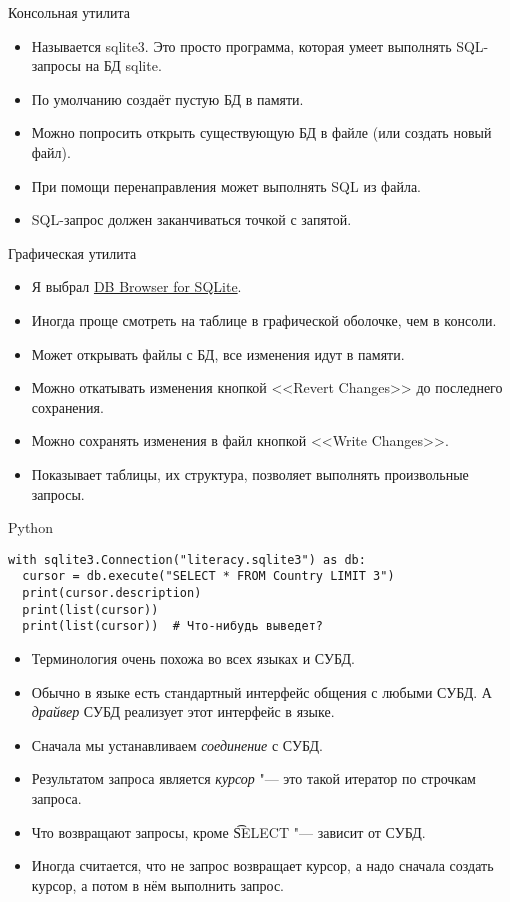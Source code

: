 \begin{frame}{Консольная утилита}
	\begin{itemize}
		\item Называется sqlite3. Это просто программа, которая умеет выполнять SQL-запросы на БД sqlite.
		\item По умолчанию создаёт пустую БД в памяти.
		\item Можно попросить открыть существующую БД в файле (или создать новый файл).
		\item При помощи перенаправления может выполнять SQL из файла.
		\item SQL-запрос должен заканчиваться точкой с запятой.
	\end{itemize}
\end{frame}

\begin{frame}{Графическая утилита}
	\begin{itemize}
		\item Я выбрал \href{http://sqlitebrowser.org/}{DB Browser for SQLite}.
		\item Иногда проще смотреть на таблице в графической оболочке, чем в консоли.
		\item Может открывать файлы с БД, все изменения идут в памяти.
		\item Можно откатывать изменения кнопкой <<Revert Changes>> до последнего сохранения.
		\item Можно сохранять изменения в файл кнопкой <<Write Changes>>.
		\item Показывает таблицы, их структура, позволяет выполнять произвольные запросы.
	\end{itemize}
\end{frame}

\begin{frame}[fragile]{Python}
\begin{verbatim}
with sqlite3.Connection("literacy.sqlite3") as db:
  cursor = db.execute("SELECT * FROM Country LIMIT 3")
  print(cursor.description)
  print(list(cursor))
  print(list(cursor))  # Что-нибудь выведет?
\end{verbatim}
	\begin{itemize}
		\item Терминология очень похожа во всех языках и СУБД.
		\item Обычно в языке есть стандартный интерфейс общения с любыми СУБД.
			А \textit{драйвер} СУБД реализует этот интерфейс в языке.
		\item Сначала мы устанавливаем \textit{соединение} с СУБД.
		\item Результатом запроса является \textit{курсор} "--- это такой итератор по строчкам запроса.
		\item Что возвращают запросы, кроме \t{SELECT} "--- зависит от СУБД.
		\item
			Иногда считается, что не запрос возвращает курсор, а надо
			сначала создать курсор, а потом в нём выполнить запрос.
	\end{itemize}
\end{frame}
